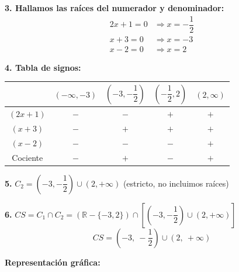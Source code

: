 \documentclass[12pt]{article}
\begin{document}
\begin{enumerate}[label=\alph*.-]
    \textbf{3. Hallamos las raíces del numerador y denominador:}
    \begin{align*}
    2x + 1 = 0 &\Rightarrow x = -\dfrac{1}{2} \\
    x + 3 = 0 &\Rightarrow x = -3 \\
    x - 2 = 0 &\Rightarrow x = 2
    \end{align*}

    \textbf{4. Tabla de signos:}

    \begin{center}
    \begin{tabular}{|c|c|c|c|c|}
    \hline
    & $(-\infty,-3)$ & $\left(-3,-\dfrac{1}{2}\right)$ & $\left(-\dfrac{1}{2},2\right)$ & $(2,\infty)$ \\
    \hline
    $(2x+1)$ & $-$ & $-$ & $+$ & $+$ \\
    \hline
    $(x+3)$ & $-$ & $+$ & $+$ & $+$ \\
    \hline
    $(x-2)$ & $-$ & $-$ & $-$ & $+$ \\
    \hline
    Cociente & $-$ & $+$ & $-$ & $+$ \\
    \hline
    \end{tabular}
    \end{center}

    \textbf{5.} $C_2 = \left(-3, -\dfrac{1}{2}\right) \cup (2, +\infty)$ \quad (estricto, no incluimos raíces)

    \textbf{6.} $CS = C_1 \cap C_2 = (\mathbb{R} - \{-3,2\}) \cap \left[\left(-3,-\dfrac{1}{2}\right) \cup (2,+\infty)\right]$
    \[
    \boxed{CS = \left(-3,\ -\dfrac{1}{2}\right) \cup (2,\ +\infty)}
    \]

    \textbf{Representación gráfica:}

    \begin{center}
    \end{center}


\end{enumerate}
\end{document}
